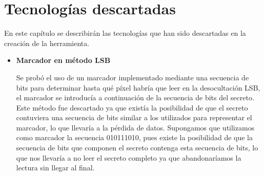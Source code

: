 \chapter{Tecnologías descartadas}
\label{cap:Tecnologíasdescartadas}

En este capítulo se describirán las tecnologías que han sido descartadas en la creación de la herramienta.\\                                                  

\begin{itemize}
    \item \textbf{Marcador en método LSB} 
    
    Se probó el uso de un marcador implementado mediante una secuencia de bits para determinar hasta qué píxel habría que leer en la desocultación LSB, el marcador se introducía a continuación de la secuencia de bits del secreto. Este método fue descartado ya que existía la posibilidad de que el secreto contuviera una secuencia de bits similar a los utilizados para representar el marcador, lo que llevaría  a la pérdida de datos. Supongamos que utilizamos como marcador la secuencia 010111010, pues existe la posibilidad de que la secuencia de bits que componen el secreto contenga esta secuencia de bits, lo que nos llevaría a no leer el secreto completo ya que abandonaríamos la lectura sin llegar al final.\\
    
\end{itemize}




